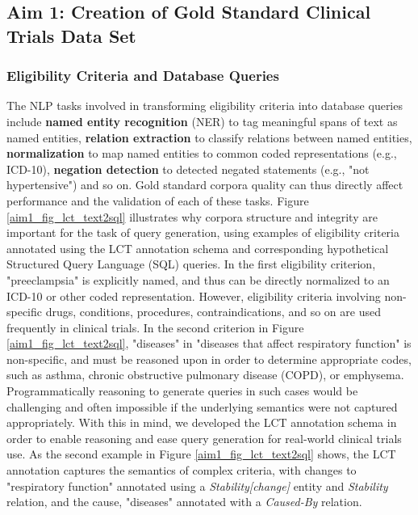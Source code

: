 \documentclass[../main.tex]{subfiles}
\begin{document}
\subsection{Aim 1: Creation of Gold Standard Clinical Trials Data Set}

\subsubsection{Eligibility Criteria and Database Queries}
The NLP tasks involved in transforming eligibility criteria into database queries include \textbf{named entity recognition} (NER) to tag meaningful spans of text as named entities, \textbf{relation extraction} to classify relations between named entities, \textbf{normalization} to map named entities to common coded representations (e.g., ICD-10), \textbf{negation detection} to detected negated statements (e.g., "not hypertensive") and so on. Gold standard corpora quality can thus directly affect performance and the validation of each of these tasks. Figure \ref{aim1_fig_lct_text2sql} illustrates why corpora structure and integrity are important for the task of query generation, using examples of eligibility criteria annotated using the LCT annotation schema and corresponding hypothetical Structured Query Language (SQL) queries. In the first eligibility criterion, "preeclampsia" is explicitly named, and thus can be directly normalized to an ICD-10 or other coded representation. However, eligibility criteria involving non-specific drugs, conditions, procedures, contraindications, and so on are used frequently in clinical trials. In the second criterion in Figure \ref{aim1_fig_lct_text2sql}, "diseases" in "diseases that affect respiratory function" is non-specific, and must be reasoned upon in order to determine appropriate codes, such as asthma, chronic obstructive pulmonary disease (COPD), or emphysema.  Programmatically reasoning to generate queries in such cases would be challenging and often impossible if the underlying semantics were not captured appropriately. With this in mind, we developed the LCT annotation schema in order to enable reasoning and ease query generation for real-world clinical trials use. As the second example in Figure \ref{aim1_fig_lct_text2sql} shows, the LCT annotation captures the semantics of complex criteria, with changes to "respiratory function" annotated using a \textit{Stability[change]} entity and \textit{Stability} relation, and the cause, "diseases" annotated with a \textit{Caused-By} relation.
\end{document}
